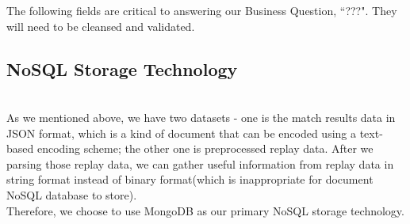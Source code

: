 \documentclass{article}
\begin{document}

The following fields are critical to answering our Business Question, ``???".
They will need to be cleansed and validated.

\subsection{NoSQL Storage Technology}\\
As we mentioned above, we have two datasets - one is the match results data in JSON format, which is a kind of document that can be encoded using a text-based encoding scheme; the other one is preprocessed replay data. After we parsing those replay data, we can gather useful information from replay data in string format instead of binary format(which is inappropriate for document NoSQL database to store).\\

Therefore, we choose to use MongoDB as our primary NoSQL storage technology.\\
\end{document}
